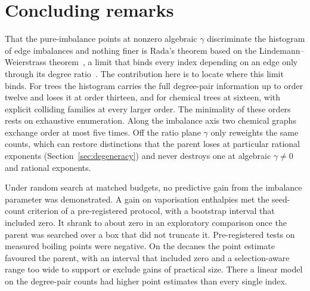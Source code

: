 \documentclass[a5paper, 10pt]{article}
\theoremstyle{plain}
\theoremstyle{remark}
\theoremstyle{definition}
\begin{document}
\section{Concluding remarks}\label{sec:limitations}\label{sec:conclusion}

That the pure-imbalance points at nonzero algebraic $\gamma$ discriminate the
histogram of edge imbalances and nothing finer is Rada's
theorem based on the Lindemann--Weierstrass theorem~\cite[Theorem~3.4]{Rada2019ExpVDB}, a limit
that binds every index depending on an edge only through its degree
ratio~\cite[Proposition~2.5]{Rada2019ExpVDB}. The contribution here is
to locate where this limit binds. For trees the histogram carries the
full degree-pair information up to order twelve and loses it at order
thirteen, and for chemical trees at sixteen, with explicit colliding
families at every larger order. The minimality of these orders rests on
exhaustive enumeration. Along the imbalance
axis two chemical graphs exchange order at most five times. Off the ratio
plane $\gamma$ only reweights the same counts, which can restore
distinctions that the parent loses at particular rational exponents
(Section~\ref{sec:degeneracy}) and never destroys one at algebraic
$\gamma \neq 0$ and rational exponents.

Under random search at matched budgets, no predictive gain from the
imbalance parameter was demonstrated. A gain on vaporisation enthalpies met the seed-count criterion of
a pre-registered protocol, with a bootstrap interval that included zero.
It shrank to about zero in an exploratory comparison once the parent was
searched over a box that did not truncate it. Pre-registered tests on
measured boiling points were negative. On the decanes the point estimate
favoured the parent, with an interval that included zero and a
selection-aware range too wide to support or exclude gains of practical
size. There a linear model on the degree-pair counts had higher point
estimates than every single index.
\end{document}
